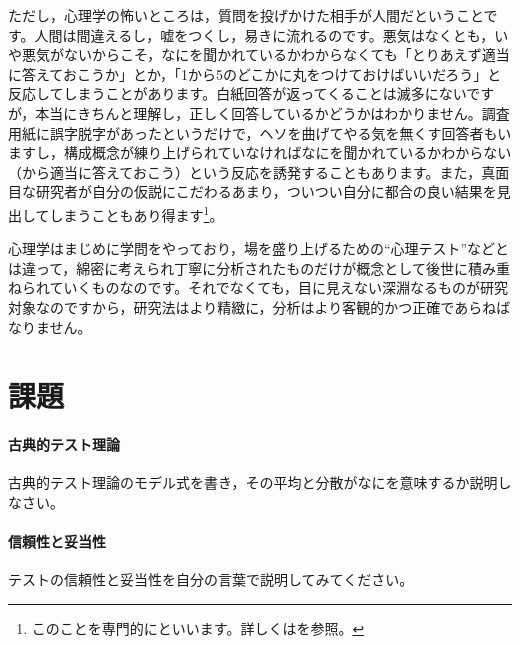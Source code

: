 \documentclass{ltjbook}
\begin{document}
ただし，心理学の怖いところは，質問を投げかけた相手が人間だということです。人間は間違えるし，嘘をつくし，易きに流れるのです。悪気はなくとも，いや悪気がないからこそ，なにを聞かれているかわからなくても「とりあえず適当に答えておこうか」とか，「1から5のどこかに丸をつけておけばいいだろう」と反応してしまうことがあります。白紙回答が返ってくることは滅多にないですが，本当にきちんと理解し，正しく回答しているかどうかはわかりません。調査用紙に誤字脱字があったというだけで，ヘソを曲げてやる気を無くす回答者もいますし，構成概念が練り上げられていなければなにを聞かれているかわからない（から適当に答えておこう）という反応を誘発することもあります。また，真面目な研究者が自分の仮説にこだわるあまり，ついつい自分に都合の良い結果を見出してしまうこともあり得ます\footnote{このことを専門的にといいます。詳しくは\textcite{kosugi2018}を参照。}。

心理学はまじめに学問をやっており，場を盛り上げるための``心理テスト''などとは違って，綿密に考えられ丁寧に分析されたものだけが概念として後世に積み重ねられていくものなのです。それでなくても，目に見えない深淵なるものが研究対象なのですから，研究法はより精緻に，分析はより客観的かつ正確であらねばなりません。

\section{課題}
\paragraph{古典的テスト理論}古典的テスト理論のモデル式を書き，その平均と分散がなにを意味するか説明しなさい。
\paragraph{信頼性と妥当性}テストの信頼性と妥当性を自分の言葉で説明してみてください。
\end{document}
